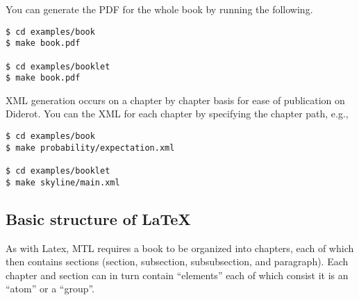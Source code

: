 \begin{example}
You can generate the PDF for the whole book by running the following.
%
\begin{lstlisting}
$ cd examples/book
$ make book.pdf

$ cd examples/booklet
$ make book.pdf
\end{lstlisting}
\end{example}

\begin{example}
XML generation occurs on a chapter by chapter basis for ease of publication on Diderot.
%
You can the XML for  each chapter by specifying the chapter path, e.g.,
\begin{lstlisting}
$ cd examples/book
$ make probability/expectation.xml

$ cd examples/booklet
$ make skyline/main.xml
\end{lstlisting}
\end{example}

\subsection{Basic structure of LaTeX} 

As with Latex, MTL requires a book to be organized into chapters, each of which then contains sections (section, subsection, subsubsection, and paragraph).  Each chapter and section can in turn contain ``elements'' each of which consist it is an ``atom'' or a  ``group''.


